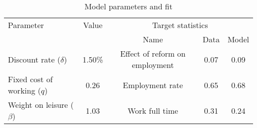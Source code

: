 \begin{table}[htbp]\caption{Model parameters and fit}\label{table:model_param}\centering\footnotesize\begin{tabular}{lcccc} \toprule  Parameter & Value & \multicolumn{3}{c}{Target statistics}  \\\cline{3-5}  &  &  Name & Data & Model  \\\midrule    Discount rate ($\delta$)      &1.50\%& Effect of reform on employment   & 0.07 &0.09\\ Fixed cost of working ($q$)   &0.26& Employment rate                  & 0.65 &0.68\\ Weight on leisure ($\beta$)   &1.03& Work full time             & 0.31 &0.24\\  \bottomrule\end{tabular}\end{table}